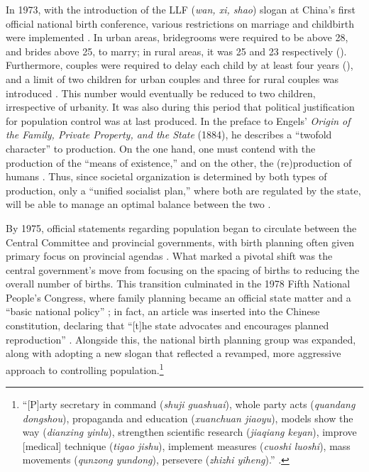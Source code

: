 In 1973, with the introduction of the LLF (\emph{wan, xi, shao}) slogan at China’s first official national birth conference, various restrictions on marriage and childbirth were implemented \autocite[p.\ 88]{GreenhalghWinckler2005}. In urban areas, bridegrooms were required to be above 28, and brides above 25, to marry; in rural areas, it was 25 and 23 respectively (\cites[p.\ 586]{BongaartsGreenhalgh1985}[p.\ 149]{WhyteWangCai2015}). Furthermore, couples were required to delay each child by at least four years (\cites[p.\ 149]{BongaartsGreenhalgh1985}[p.\ 149]{WhyteWangCai2015}), and a limit of two children for urban couples and three for rural couples was introduced \autocite[p.\ 586]{BongaartsGreenhalgh1985}. This number would eventually be reduced to two children, irrespective of urbanity. It was also during this period that political justification for population control was at last produced. In the preface to Engels’ \emph{Origin of the Family, Private Property, and the State} (1884), he describes a “twofold character” to production. On the one hand, one must contend with the production of the “means of existence,” and on the other, the (re)production of humans \autocite[pp.\ 71--72]{Engels1972}. Thus, since societal organization is determined by both types of production, only a “unified socialist plan,” where both are regulated by the state, will be able to manage an optimal balance between the two \autocite[p.\ 71]{Greenhalgh2008JustOneChild}.

By 1975, official statements regarding population began to circulate between the Central Committee and provincial governments, with birth planning often given primary focus on provincial agendas \autocite[p.\ 89]{GreenhalghWinckler2005}. What marked a pivotal shift was the central government’s move from focusing on the spacing of births to reducing the overall number of births. This transition culminated in the 1978 Fifth National People’s Congress, where family planning became an official state matter and a “basic national policy” \autocite{LinZhibo2007};  in fact, an article was inserted into the Chinese constitution, declaring that “[t]he state advocates and encourages planned reproduction” \autocite[p.\ 65]{Tien1980WanXiShao}. Alongside this, the national birth planning group was expanded, along with adopting a new slogan that reflected a revamped, more aggressive approach to controlling population.\footnote{“[P]arty secretary in command (\emph{shuji guashuai}), whole party acts (\emph{quandang dongshou}), propaganda and education (\emph{xuanchuan jiaoyu}), models show the way (\emph{dianxing yinlu}), strengthen scientific research (\emph{jiaqiang keyan}), improve [medical] technique (\emph{tigao jishu}), implement measures (\emph{cuoshi luoshi}), mass movements (\emph{qunzong yundong}), persevere (\emph{zhizhi yiheng}).” \cite{GreenhalghWinckler2005}.}

